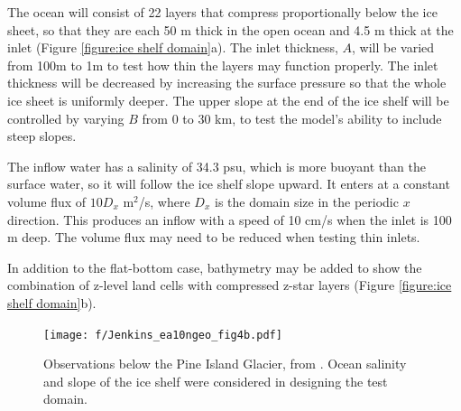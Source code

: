 \documentclass[11pt]{report}
\begin{document}
The ocean will consist of 22 layers that compress proportionally below the ice sheet, so that they are each 50 m thick in the open ocean and 4.5 m thick at the inlet (Figure \ref{figure:ice shelf domain}a).  The inlet thickness, $A$, will be varied from 100m to 1m to test how thin the layers may function properly.  The inlet thickness will be decreased by increasing the surface pressure so that the whole ice sheet is uniformly deeper.  The upper slope at the end of the ice shelf will be controlled by varying $B$ from 0 to 30 km, to test the model's ability to include steep slopes.

The inflow water has a salinity of 34.3 psu, which is more buoyant than the surface water, so it will follow the ice shelf slope upward.  It enters at a constant volume flux of $10 D_x$ m$^2$/s, where $D_x$ is the domain size in the periodic $x$ direction.  This produces an inflow with a speed of 10 cm/s when the inlet is 100 m deep.  The volume flux may need to be reduced when testing thin inlets.  

In addition to the flat-bottom case, bathymetry may be added to show the combination of z-level land cells with compressed z-star layers (Figure \ref{figure:ice shelf domain}b).


\begin{figure}[tbh]
\center
\texttt{[image: f/Jenkins\_ea10ngeo\_fig4b.pdf]}
\caption{Observations below the Pine Island Glacier, from \citet{Jenkins_ea10ngeo}.  Ocean salinity and slope of the ice shelf were considered in designing the test domain.}
\label{figure:pig observations}
\end{figure}
\end{document}
